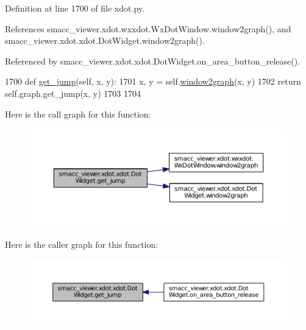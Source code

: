 Definition at line 1700 of file xdot.\+py.



References smacc\+\_\+viewer.\+xdot.\+wxxdot.\+Wx\+Dot\+Window.\+window2graph(), and smacc\+\_\+viewer.\+xdot.\+xdot.\+Dot\+Widget.\+window2graph().



Referenced by smacc\+\_\+viewer.\+xdot.\+xdot.\+Dot\+Widget.\+on\+\_\+area\+\_\+button\+\_\+release().


\begin{DoxyCode}
1700     \textcolor{keyword}{def }\hyperlink{classsmacc__viewer_1_1xdot_1_1xdot_1_1DotWidget_ab1887c93ca72f4aa9bef7d345efb740a}{get\_jump}(self, x, y):
1701         x, y = self.\hyperlink{classsmacc__viewer_1_1xdot_1_1xdot_1_1DotWidget_aa5dfc398a1a7e23e74d0798f4523fdfb}{window2graph}(x, y)
1702         \textcolor{keywordflow}{return} self.graph.get\_jump(x, y)
1703 
1704 
\end{DoxyCode}


Here is the call graph for this function\+:
\nopagebreak
\begin{figure}[H]
\begin{center}
\leavevmode
\includegraphics[width=350pt]{classsmacc__viewer_1_1xdot_1_1xdot_1_1DotWidget_ab1887c93ca72f4aa9bef7d345efb740a_cgraph}
\end{center}
\end{figure}




Here is the caller graph for this function\+:
\nopagebreak
\begin{figure}[H]
\begin{center}
\leavevmode
\includegraphics[width=350pt]{classsmacc__viewer_1_1xdot_1_1xdot_1_1DotWidget_ab1887c93ca72f4aa9bef7d345efb740a_icgraph}
\end{center}
\end{figure}


